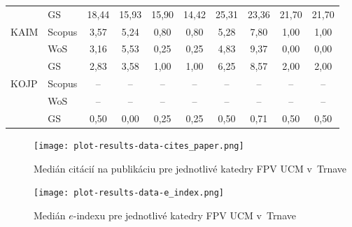 \begin{table}
\begin{tabularx}{\textwidth}{XXcccc@{\hspace{3ex}}cccc}
      & GS     & 18,44       & 15,93 & 15,90 & 14,42 & 25,31   & 23,36 & 21,70 & 21,70 \\[3ex]
 KAIM & Scopus & 3,57        & 5,24  & 0,80  & 0,80  & 5,28    & 7,80  & 1,00  & 1,00  \\
      & WoS    & 3,16        & 5,53  & 0,25  & 0,25  & 4,83    & 9,37  & 0,00  & 0,00  \\
      & GS     & 2,83        & 3,58  & 1,00  & 1,00  & 6,25    & 8,57  & 2,00  & 2,00  \\[3ex]
 KOJP & Scopus & --          & --    & --    & --    & --      & --    & --    & --    \\
      & WoS    & --          & --    & --    & --    & --      & --    & --    & --    \\
      & GS     & 0,50        & 0,00  & 0,25  & 0,25  & 0,50    & 0,71  & 0,50  & 0,50  \\[0.5ex]
  \bottomrule
\end{tabularx}
\end{table}

\begin{figure}
  \centering
  \texttt{[image: plot-results-data-cites\_paper.png]}
  \caption{Medián citácií na publikáciu pre jednotlivé katedry FPV UCM v~Trnave}
  \label{fig:c/p.plot}
\end{figure}

\begin{figure}
  \centering
  \texttt{[image: plot-results-data-e\_index.png]}
  \caption{Medián $e$-indexu pre jednotlivé katedry FPV UCM v~Trnave}
  \label{fig:e-index.plot}
\end{figure}
\clearpage



